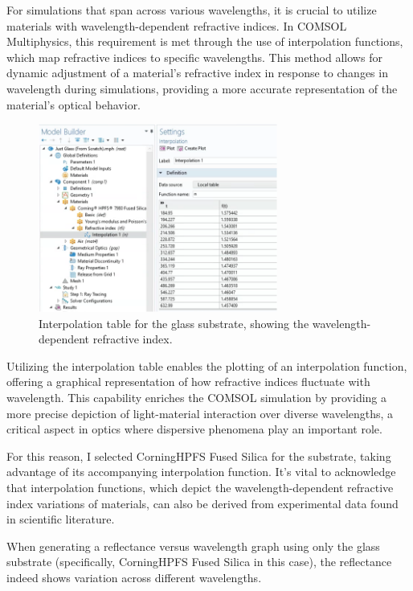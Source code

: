 For simulations that span across various wavelengths, it is crucial to utilize materials with wavelength-dependent refractive indices. In COMSOL Multiphysics, this requirement is met through the use of interpolation functions, which map refractive indices to specific wavelengths. This method allows for dynamic adjustment of a material's refractive index in response to changes in wavelength during simulations, providing a more accurate representation of the material's optical behavior.

\begin{figure}[H]
  \centering
  \includegraphics[width=0.7\textwidth]{Chapters/Figures/Chapter 4 Figures/Interpolation Table for Glass Substrate.png}
  \caption{Interpolation table for the glass substrate, showing the wavelength-dependent refractive index.}
  \label{fig:interpolation-table-glass}
\end{figure}

Utilizing the interpolation table enables the plotting of an interpolation function, offering a graphical representation of how refractive indices fluctuate with wavelength. This capability enriches the COMSOL simulation by providing a more precise depiction of light-material interaction over diverse wavelengths, a critical aspect in optics where dispersive phenomena play an important role.

For this reason, I selected Corning\texttrademark \space HPFS\texttrademark {} Fused Silica for the substrate, taking advantage of its accompanying interpolation function. It's vital to acknowledge that interpolation functions, which depict the wavelength-dependent refractive index variations of materials, can also be derived from experimental data found in scientific literature.

When generating a reflectance versus wavelength graph using only the glass substrate (specifically, Corning\texttrademark \space HPFS\texttrademark {} Fused Silica in this case), the reflectance indeed shows variation across different wavelengths.

